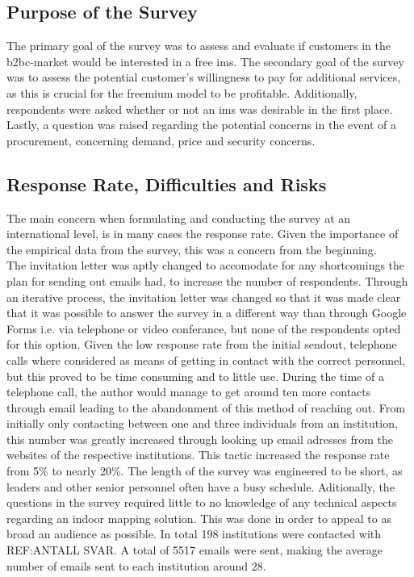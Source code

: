 \subsection{Purpose of the Survey}
The primary goal of the survey was to assess and evaluate if customers in the \gls{b2bc}-market would be interested in a free \gls{ims}. The secondary goal of the survey was to assess the potential customer's willingness to pay for additional services, as this is crucial for the freemium model to be profitable. Additionally, respondents were asked whether or not an \gls{ims} was desirable in the first place. Lastly, a question was raised regarding the potential concerns in the event of a procurement, concerning demand, price and security concerns.

\subsection{Response Rate, Difficulties and Risks}
The main concern when formulating and conducting the survey at an international level, is in many cases the response rate. Given the importance of the empirical data from the survey, this was a concern from the beginning. 
\newline
\\
The invitation letter was aptly changed to accomodate for any shortcomings the plan for sending out emails had, to increase the number of respondents. Through an iterative process, the invitation letter was changed so that it was made clear that it was possible to answer the survey in a different way than through Google Forms i.e. via telephone or video conferance, but none of the respondents opted for this option. Given the low response rate from the initial sendout, telephone calls where considered as means of getting in contact with the correct personnel, but this proved to be time consuming and to little use. During the time of a telephone call, the author would manage to get around ten more contacts through email leading to the abandonment of this method of reaching out. From initially only contacting between one and three individuals from an institution, this number was greatly increased through looking up email adresses from the websites of the respective institutions. This tactic increased the response rate from 5\% to nearly 20\%.  The length of the survey was engineered to be short, as leaders and other senior personnel often have a busy schedule. Aditionally, the questions in the survey required little to no knowledge of any technical aspects regarding an indoor mapping solution. This was done in order to appeal to as broad an audience as possible. In total 198 institutions were contacted with REF:ANTALL SVAR. A total of 5517 emails were sent, making the average number of emails sent to each institution around 28. 
